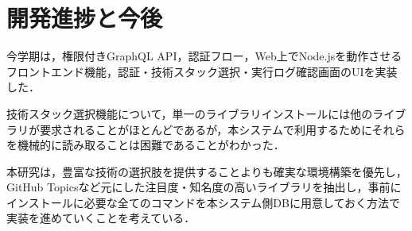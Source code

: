 \documentclass[main]{subfiles}
\begin{document}
\section{開発進捗と今後}
 今学期は，権限付きGraphQL API，認証フロー，Web上でNode.jsを動作させるフロントエンド機能，認証・技術スタック選択・実行ログ確認画面のUIを実装した．

 技術スタック選択機能について，単一のライブラリインストールには他のライブラリが要求されることがほとんどであるが，本システムで利用するためにそれらを機械的に読み取ることは困難であることがわかった．

 本研究は，豊富な技術の選択肢を提供することよりも確実な環境構築を優先し，GitHub Topicsなど元にした注目度・知名度の高いライブラリを抽出し，事前にインストールに必要な全てのコマンドを本システム側DBに用意しておく方法で実装を進めていくことを考えている．
\end{document}
